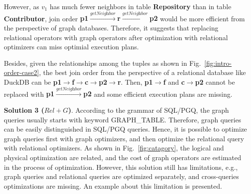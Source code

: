 {\begin{example}
    However, as $v_1$ has much fewer neighbors in table \textbf{Repository} than in table \textbf{Contributor}, join order \textbf{p1$\xrightarrow{\textit{getNeighbor}}$r$\xrightarrow{\textit{getNeighbor}}$p2} would be more efficient from the perspective of graph databases.
    Therefore, it suggests that
    replacing relational operators with graph operators after optimization with relational optimizers can miss optimial execution plans.

    Besides, given the relationships among the tuples as shown in Fig.~\ref{fig:intro-order-case2}, the best join order from the perspective of a relational database like DuckDB can be \textbf{p1$\rightarrow$f$\rightarrow$c$\rightarrow$p2$\rightarrow$r}.
    Then, \textbf{p1$\rightarrow$f} and \textbf{c$\rightarrow$p2} cannot be replaced with \textbf{p1$\xrightarrow{\textit{getNeighbor}}$p2} and some efficient execution plans are missing.

\end{example}


\textbf{Solution 3 ($Rel+G$)}.
According to the grammar of SQL/PGQ, the graph queries usually starts with keyword GRAPH\_TABLE.
Therefore, graph queries can be easily distinguished in SQL/PGQ queries.
Hence, it is possible to optimize graph queries first with graph optimizers, and then optimize the relational query with relational optimizers.
As shown in Fig.~\ref{fig:catagory}, the logical and physical optimization are related, and the cost of graph operators are estimated in the process of optimization.
However, this solution still has limitations, e.g., graph queries and relational queries are optimized separately, and cross-queries optimizations are missing.
An example about this limitation is presented.

}
